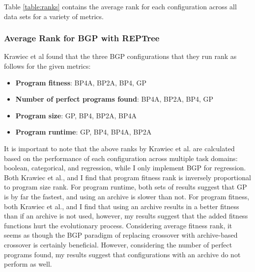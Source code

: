 %

Table \ref{table:ranks} contains the average rank for each configuration across all data sets for a variety of metrics.


\subsubsection{Average Rank for BGP with REPTree}
Krawiec et al found that the three BGP configurations that they run rank as follows for the given metrics:

\begin{itemize}[noitemsep]
\item \textbf{Program fitness}: BP4A, BP2A, BP4, GP
\item \textbf{Number of perfect programs found}: BP4A, BP2A, BP4, GP
\item \textbf{Program size}: GP, BP4, BP2A, BP4A
\item \textbf{Program runtime}: GP, BP4, BP4A, BP2A
\end{itemize}

It is important to note that the above ranks by Krawiec et al. are calculated based on the performance of each configuration across multiple task domains: boolean, categorical, and regression, while I only implement BGP for regression.  Both Krawiec et al., and I find that program fitness rank is inversely proportional to program size rank.  For program runtime, both sets of results suggest that GP is by far the fastest, and using an archive is slower than not.  For program fitness, both Krawiec et al., and I find that using an archive results in a better fitness than if an archive is not used, however, my results suggest that the added fitness functions hurt the evolutionary process.  Considering average fitness rank, it seems as though the BGP paradigm of replacing crossover with archive-based crossover is certainly beneficial.  However, considering the number of perfect programs found, my results suggest that configurations with an archive do not perform as well.

